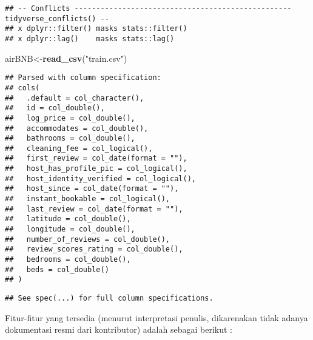 \documentclass[]{article}
\newenvironment{Shaded}{\begin{snugshade}}{\end{snugshade}}
\newcommand{\KeywordTok}[1]{\textcolor[rgb]{0.13,0.29,0.53}{\textbf{#1}}}
\newcommand{\NormalTok}[1]{#1}
\newcommand{\StringTok}[1]{\textcolor[rgb]{0.31,0.60,0.02}{#1}}
\begin{document}
\begin{verbatim}
## -- Conflicts -------------------------------------------------- tidyverse_conflicts() --
## x dplyr::filter() masks stats::filter()
## x dplyr::lag()    masks stats::lag()
\end{verbatim}

\begin{Shaded}
\begin{Highlighting}[]
\NormalTok{airBNB<-}\KeywordTok{read_csv}\NormalTok{(}\StringTok{"train.csv"}\NormalTok{)}
\end{Highlighting}
\end{Shaded}

\begin{verbatim}
## Parsed with column specification:
## cols(
##   .default = col_character(),
##   id = col_double(),
##   log_price = col_double(),
##   accommodates = col_double(),
##   bathrooms = col_double(),
##   cleaning_fee = col_logical(),
##   first_review = col_date(format = ""),
##   host_has_profile_pic = col_logical(),
##   host_identity_verified = col_logical(),
##   host_since = col_date(format = ""),
##   instant_bookable = col_logical(),
##   last_review = col_date(format = ""),
##   latitude = col_double(),
##   longitude = col_double(),
##   number_of_reviews = col_double(),
##   review_scores_rating = col_double(),
##   bedrooms = col_double(),
##   beds = col_double()
## )
\end{verbatim}

\begin{verbatim}
## See spec(...) for full column specifications.
\end{verbatim}

Fitur-fitur yang tersedia (menurut interpretasi penulis, dikarenakan
tidak adanya dokumentasi resmi dari kontributor) adalah sebagai berikut
:
\end{document}
